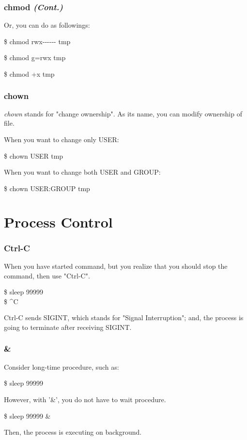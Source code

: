 \documentclass{beamer}
\begin{document}
	\begin{frame}
		\frametitle{chmod \textit{(Cont.)}}
		Or, you can do as followings:
		
		\begin{example}
			\$ chmod rwx-$ $-$ $-$ $-$ $-$ $- tmp
		\end{example}
	
		\begin{example}
			\$ chmod g=rwx tmp
		\end{example}
	
		\begin{example}
			\$ chmod +x tmp
		\end{example}
	\end{frame}

	\begin{frame}
		\frametitle{chown}
		\textit{chown} stands for "change ownership". As its name, you can modify ownership of file.
		
		When you want to change only USER:
		\begin{example}
			\$ chown USER tmp
		\end{example}
	
		When you want to change both USER and GROUP:
		\begin{example}
			\$ chown USER:GROUP tmp
		\end{example}
	\end{frame}
	
	\section{Process Control}
	
	\begin{frame}
		\frametitle{Ctrl-C}
		When you have started command, but you realize that you should stop the command, then use "Ctrl-C".
		\begin{example}
			\$ sleep 99999 \\
			\$ \^{}C
		\end{example}
	
		Ctrl-C sends SIGINT, which stands for "Signal Interruption"; and, the process is going to terminate after receiving SIGINT.
	\end{frame}
	
	\begin{frame}
		\frametitle{\&}
		Consider long-time procedure, such as:
		\begin{example}
			\$ sleep 99999
		\end{example}
	
		However, with '\&', you do not have to wait procedure.
		\begin{example}
			\$ sleep 99999 \&
		\end{example}
		Then, the process is executing on background. 
	\end{frame}
\end{document}

